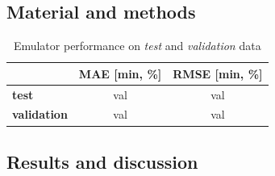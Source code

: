 \subsection{Material and methods}

\begin{table}[htpb]
  \centering
  \caption{Emulator performance on \emph{test} and \emph{validation} data}
  \label{table label}
  \begin{tabular}{lcc}
    \toprule
     & \textbf{MAE [\si{\minute}, \si{\percent}]} & \textbf{RMSE [\si{\minute}, \si{\percent}]} \\
    \midrule
    \textbf{test} & val & val \\
    \textbf{validation} & val & val \\
    \bottomrule
  \end{tabular}
\end{table}


\subsection{Results and discussion}





